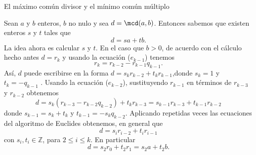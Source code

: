 \begin{section}{El máximo común divisor y el mínimo común
múltiplo}



Sean $a$ y $b$ enteros, $b$ no nulo y sea $d=\mcd(a,b)$. Entonces sabemos que existen enteros $s$ y $t$ tales que
$$
d=sa+tb.
$$
La idea ahora es calcular $s$ y $t$. En el caso que $b >0$, de acuerdo con el cálculo hecho antes $d=r_{k}$ y usando la  ecuación ($e_{k-1}$) tenemos
$$
r_{k}=r_{k-2} -r_{k-1}q_{k-1}.
$$
As{í}, $d$ puede escribirse en la forma $ d = s_{k}r_{k-2} +t_{k}r_{k-1}$,donde $s_{k}=1$ y $t_{k}=-q_{k-1}$ . Usando la ecuación  ($e_{k-2}$), sustituyendo $r_{k-1}$ en términos de $r_{k-3}$ y $r_{k-2}$ obtenemos
$$
d= s_{k}(r_{k-3}-r_{k-2}q_{k-2}) + t_{k}r_{k-3} =  s_{k-1}r_{k-3} +t_{k-1}r_{k-2}
$$
donde $s_{k-1} = s_{k} + t_{k} $ y $t_{k-1}= -s_{k}q_{k-2}$.  Aplicando  repetidas veces las ecuaciones del algoritmo de Euclides obtenemos, en general que 
$$
d =  s_{i}r_{i-2} +t_{i}r_{i-1}
$$
con  $s_{i}, t_{i} \in \mathbb Z$, para $2 \le i \le k$. En particular 
$$
d =  s_{2}r_{0} +t_{2}r_{1} = s_{2}a +t_{2}b.
$$


\end{section}
